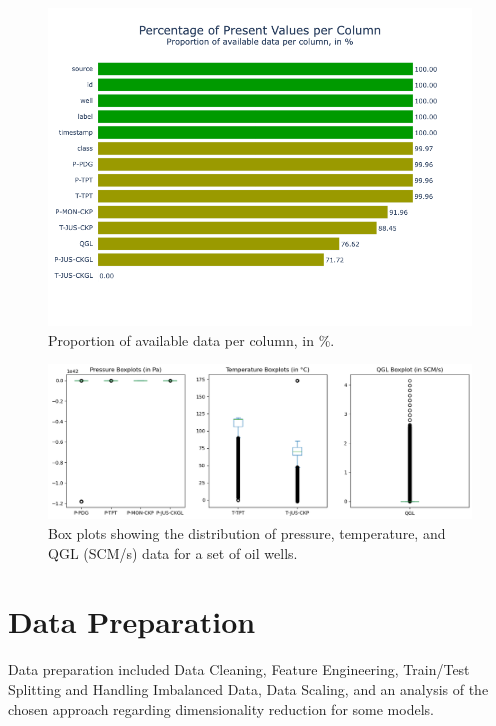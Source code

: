 \documentclass{article}
\begin{document}
\begin{figure}
\centering
\includegraphics[width=1\textwidth]{missingvalues.png}
\caption{\label{fig:missingvalues}Proportion of available data per column, in \%.}
\end{figure}


\begin{figure}
\centering
\includegraphics[width=1\textwidth]{distr_boxplots_before_cleaning.png}
\caption{\label{fig:distr_boxplots_before_cleaning}Box plots showing the distribution of pressure, temperature, and QGL (SCM/s) data for a set of oil wells.}
\end{figure}


\section{Data Preparation}

Data preparation included Data Cleaning, Feature Engineering, Train/Test Splitting and Handling Imbalanced Data, Data Scaling, and an analysis of the chosen approach regarding dimensionality reduction for some models.
\end{document}
